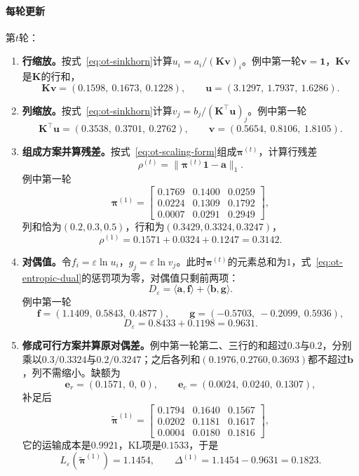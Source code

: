 \paragraph{每轮更新}
第$t$轮：
\begin{enumerate}
 \item \textbf{行缩放。}按式~\eqref{eq:ot-sinkhorn}计算$u_i=a_i/(\bm{K}\bm{v})_i$。例中第一轮$\bm{v}=\bm{1}$，$\bm{K}\bm{v}$是$\bm{K}$的行和，
 \[
  \bm{K}\bm{v}=(0.1598,\ 0.1673,\ 0.1228),\qquad \bm{u}=(3.1297,\ 1.7937,\ 1.6286).
 \]

 \item \textbf{列缩放。}按式~\eqref{eq:ot-sinkhorn}计算$v_j=b_j/(\bm{K}^{\top}\bm{u})_j$。例中第一轮
 \[
  \bm{K}^{\top}\bm{u}=(0.3538,\ 0.3701,\ 0.2762),\qquad \bm{v}=(0.5654,\ 0.8106,\ 1.8105).
 \]

 \item \textbf{组成方案并算残差。}按式~\eqref{eq:ot-scaling-form}组成$\bm{\pi}^{(t)}$，计算行残差
 \[
  \rho^{(t)}=\lVert\bm{\pi}^{(t)}\bm{1}-\bm{a}\rVert_1 .
 \]
 例中第一轮
 \[
  \bm{\pi}^{(1)}=\begin{bmatrix}0.1769&0.1400&0.0259\\0.0224&0.1309&0.1792\\0.0007&0.0291&0.2949\end{bmatrix},
 \]
 列和恰为$(0.2,0.3,0.5)$，行和为$(0.3429,0.3324,0.3247)$，
 \[
  \rho^{(1)}=0.1571+0.0324+0.1247=0.3142 .
 \]

 \item \textbf{对偶值。}令$f_i=\varepsilon\ln u_i$，$g_j=\varepsilon\ln v_j$。此时$\bm{\pi}^{(t)}$的元素总和为$1$，式~\eqref{eq:ot-entropic-dual}的惩罚项为零，对偶值只剩前两项：
 \[
  D_\varepsilon=\langle\bm{a},\bm{f}\rangle+\langle\bm{b},\bm{g}\rangle .
 \]
 例中第一轮
 \[
  \bm{f}=(1.1409,\ 0.5843,\ 0.4877),\qquad \bm{g}=(-0.5703,\ -0.2099,\ 0.5936),
 \]
 \[
  D_\varepsilon=0.8433+0.1198=0.9631 .
 \]

 \item \textbf{修成可行方案并算原对偶差。}例中第一轮第二、三行的和超过$0.3$与$0.2$，分别乘以$0.3/0.3324$与$0.2/0.3247$；之后各列和$(0.1976,0.2760,0.3693)$都不超过$\bm{b}$，列不需缩小。缺额为
 \[
  \bm{e}_r=(0.1571,\ 0,\ 0),\qquad \bm{e}_c=(0.0024,\ 0.0240,\ 0.1307),
 \]
 补足后
 \[
  \tilde{\bm{\pi}}^{(1)}=\begin{bmatrix}0.1794&0.1640&0.1567\\0.0202&0.1181&0.1617\\0.0004&0.0180&0.1816\end{bmatrix},
 \]
 它的运输成本是$0.9921$，KL项是$0.1533$，于是
 \[
  L_\varepsilon(\tilde{\bm{\pi}}^{(1)})=1.1454,\qquad \Delta^{(1)}=1.1454-0.9631=0.1823 .
 \]


\end{enumerate}
